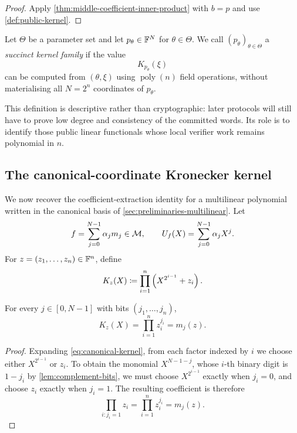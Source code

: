 \begin{proof}
Apply \cref{thm:middle-coefficient-inner-product} with $b=p$ and use \cref{def:public-kernel}.
\end{proof}

\begin{definition}
\label{def:succinct-kernel-family}
Let $\Theta$ be a parameter set and let $p_\theta\in\mathbb{F}^N$ for $\theta\in\Theta$.  We call $(p_\theta)_{\theta\in\Theta}$ a \emph{succinct kernel family} if the value
\[
  K_{p_\theta}(\xi)
\]
can be computed from $(\theta,\xi)$ using $\operatorname{poly}(n)$ field operations, without materialising all $N=2^n$ coordinates of $p_\theta$.
\end{definition}

This definition is descriptive rather than cryptographic: later protocols will still have to prove low degree and consistency of the committed words.  Its role is to identify those public linear functionals whose local verifier work remains polynomial in $n$.

\subsection{The canonical-coordinate Kronecker kernel}
\label{sec:canonical-kernel}

We now recover the coefficient-extraction identity for a multilinear polynomial written in the canonical basis of \cref{sec:preliminaries-multilinear}.  Let
\[
  f=\sum_{j=0}^{N-1}\alpha_jm_j\in\mathcal{M},
  \qquad
  U_f(X)=\sum_{j=0}^{N-1}\alpha_jX^j.
\]
For $z=(z_1,\ldots,z_n)\in\mathbb{F}^n$, define
\begin{equation}
  K_z(X)
  \coloneqq
  \prod_{i=1}^{n}\left(X^{2^{i-1}}+z_i\right).
  \label{eq:canonical-kernel}
\end{equation}

\begin{lemma}
\label{lem:canonical-kernel-coefficients}
For every $j\in[0,N-1]$ with bits $(j_1,\ldots,j_n)$,
\begin{equation}
  [X^{N-1-j}]K_z(X)
  =\prod_{i=1}^{n}z_i^{j_i}
  =m_j(z).
  \label{eq:canonical-kernel-coefficient}
\end{equation}
\end{lemma}

\begin{proof}
Expanding \eqref{eq:canonical-kernel}, from each factor indexed by $i$ we choose either $X^{2^{i-1}}$ or $z_i$.  To obtain the monomial $X^{N-1-j}$, whose $i$-th binary digit is $1-j_i$ by \cref{lem:complement-bits}, we must choose $X^{2^{i-1}}$ exactly when $j_i=0$, and choose $z_i$ exactly when $j_i=1$.  The resulting coefficient is therefore
\[
  \prod_{i:j_i=1}z_i
  =\prod_{i=1}^{n}z_i^{j_i}
  =m_j(z).
\]
\end{proof}

